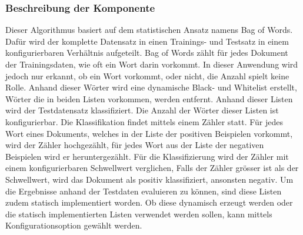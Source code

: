 \subsubsection{Beschreibung der Komponente}
Dieser Algorithmus basiert auf dem statistischen Ansatz namens \glqq Bag of Words\grqq{}.
Dafür wird der komplette Datensatz in einen Trainings- und Testsatz in einem konfigurierbaren Verhältnis aufgeteilt.
Bag of Words zählt für jedes Dokument der Trainingsdaten, wie oft ein Wort darin vorkommt.
In dieser Anwendung wird jedoch nur erkannt, ob ein Wort vorkommt, oder nicht, die Anzahl spielt keine Rolle.
Anhand dieser Wörter wird eine dynamische Black- und Whitelist erstellt, Wörter die in beiden Listen vorkommen, werden entfernt.
Anhand dieser Listen wird der Testdatensatz klassifiziert.
Die Anzahl der Wörter dieser Listen ist konfigurierbar.
Die Klassifikation findet mittels einem Zähler statt.
Für jedes Wort eines Dokuments, welches in der Liste der positiven Beispielen vorkommt, wird der Zähler hochgezählt, für jedes Wort aus der Liste der negativen Beispielen wird er heruntergezählt.
Für die Klassifizierung wird der Zähler mit einem konfigurierbaren Schwellwert verglichen, Falls der Zähler grösser ist als der Schwellwert, wird das Dokument als positiv klassifiziert, ansonsten negativ.
Um die Ergebnisse anhand der Testdaten evaluieren zu können, sind diese Listen zudem statisch implementiert worden.
Ob diese dynamisch erzeugt werden oder die statisch implementierten Listen verwendet werden sollen, kann mittels Konfigurationsoption gewählt werden.
